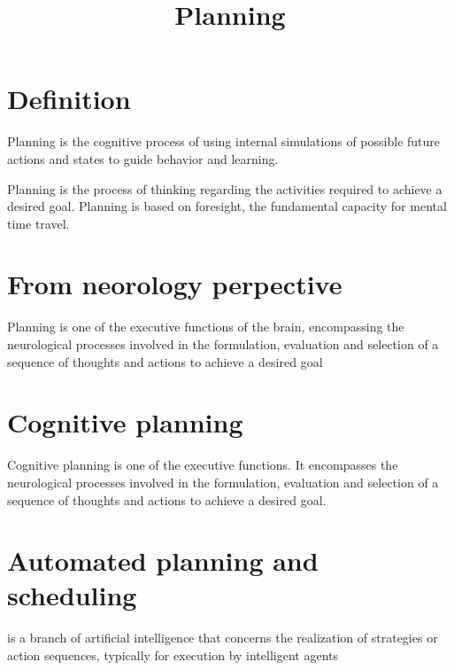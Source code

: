 \documentclass[a4paper]{article}
\title{Planning}
\date{}
\begin{document}
   \maketitle

   \section{Definition}

   \cite{mattar-2026-planning-in-the-brain-its-not-what-you-think-it-is}
   Planning is the cognitive process of using internal simulations of possible future actions and states to guide behavior and learning.



   Planning is the process of thinking regarding the activities required to achieve a desired goal. Planning is based on foresight, the fundamental capacity for mental time travel. 


   \section{From neorology perpective}
      Planning is one of the executive functions of the brain, encompassing the neurological processes involved in the formulation, evaluation and selection of a sequence of thoughts and actions to achieve a desired goal


   \section{Cognitive planning}

      Cognitive planning is one of the executive functions. It encompasses the neurological processes involved in the formulation, evaluation and selection of a sequence of thoughts and actions to achieve a desired goal.


   \section{Automated planning and scheduling}
      is a branch of artificial intelligence that concerns the realization of strategies or action sequences, typically for execution by intelligent agents 
\end{document}
